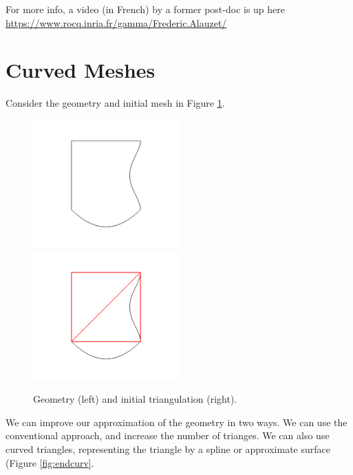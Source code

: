 \documentclass[12pt]{article}
\begin{document}
For more info, a video (in French) by a former post-doc is up here \url{https://www.rocq.inria.fr/gamma/Frederic.Alauzet/}

\section{Curved Meshes}
Consider the geometry and initial mesh in Figure \ref{fig:initcurv}.
\begin{figure}
\includegraphics[width=0.5\textwidth]{images/curvedgeom.png}
\includegraphics[width=0.5\textwidth]{images/curved1.png}
\caption{Geometry (left) and initial triangulation (right).}
\label{fig:initcurv}
\end{figure}
We can improve our approximation of the geometry in two ways. We can use the conventional approach, and increase the number of trianges. We can also use curved triangles, representing the triangle by a spline or approximate surface (Figure \ref{fig:endcurv}.
\end{document}
